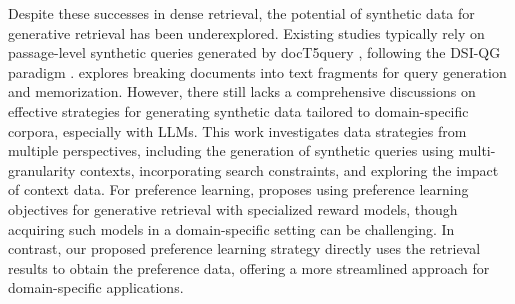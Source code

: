 Despite these successes in dense retrieval, the potential of synthetic data for generative retrieval has been underexplored.
Existing studies typically rely on passage-level synthetic queries generated by docT5query \cite{nogueiradoc2query}, following the DSI-QG paradigm \cite{DBLP:journals/corr/abs-2206-10128}.
\citet{chen-etal-2023-understanding} explores breaking documents into text fragments for query generation and memorization. However, there still lacks a comprehensive discussions on effective strategies for generating synthetic data tailored to domain-specific corpora, especially with LLMs.
This work investigates data strategies from multiple perspectives, including the generation of synthetic queries using multi-granularity contexts, incorporating search constraints, and exploring the impact of context data. For preference learning, \citet{zhou-etal-2023-enhancing-generative} proposes using preference learning objectives for generative retrieval with specialized reward models, though acquiring such models in a domain-specific setting can be challenging.
In contrast, our proposed preference learning strategy directly uses the retrieval results to obtain the preference data, offering a more streamlined approach for domain-specific applications.